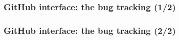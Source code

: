 \documentclass[8pt]{beamer}
\begin{document}
\begin{frame}
  \frametitle{GitHub interface: the bug tracking (1/2)}
  \centering {}
\end{frame}
\begin{frame}
  \frametitle{GitHub interface: the bug tracking (2/2)}
  \centering {}
\end{frame}
\end{document}

